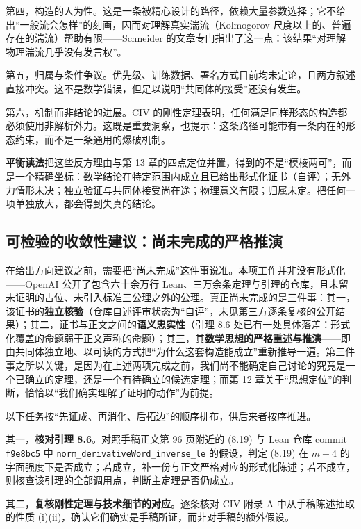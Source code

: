第四，构造的人为性。这是一条被精心设计的路径，依赖大量参数选择；它不给出“一般流会怎样”的刻画，因而对理解真实湍流（Kolmogorov 尺度以上的、普遍存在的湍流）帮助有限——Schneider 的文章专门指出了这一点：该结果“对理解物理湍流几乎没有发言权”。

第五，归属与条件争议。优先级、训练数据、署名方式目前均未定论，且两方叙述直接冲突。这不是数学错误，但足以说明“共同体的接受”还没有发生。

第六，机制而非结论的进展。CIV 的刚性定理表明，任何满足同样形态的构造都必须使用非解析外力。这既是重要洞察，也提示：这条路径可能带有一条内在的形态约束，而不是一条通用的爆破机制。

\begin{keybox}
\textbf{平衡读法}\quad 把这些反方理由与第 13 章的四点定位并置，得到的不是“模棱两可”，而是一个精确坐标：数学结论在特定范围内成立且已给出形式化证书（自评）；无外力情形未决；独立验证与共同体接受尚在途；物理意义有限；归属未定。把任何一项单独放大，都会得到失真的结论。
\end{keybox}

\subsection{可检验的收敛性建议：尚未完成的严格推演}

在给出方向建议之前，需要把“尚未完成”这件事说准。本项工作并非没有形式化——OpenAI 公开了包含六十余万行 Lean、三万余条定理与引理的仓库，且未留未证明的占位、未引入标准三公理之外的公理。真正尚未完成的是三件事：其一，该证书的\textbf{独立核验}（仓库自述评审状态为“自评”，未见第三方逐条复核的公开结果）；其二，证书与正文之间的\textbf{语义忠实性}（引理 8.6 处已有一处具体落差：形式化覆盖的命题弱于正文声称的命题）；其三，其\textbf{数学思想的严格重述与推演}——即由共同体独立地、以可读的方式把“为什么这套构造能成立”重新推导一遍。第三件事之所以关键，是因为在上述两项完成之前，我们尚不能确定自己讨论的究竟是一个已确立的定理，还是一个有待确立的候选定理；而第 12 章关于“思想定位”的判断，恰恰以“我们确实理解了证明的动作”为前提。

以下任务按“先证成、再消化、后拓边”的顺序排布，供后来者按序推进。

其一，\textbf{核对引理 8.6}。对照手稿正文第 96 页附近的 (8.19) 与 Lean 仓库 commit \texttt{f9e8bc5} 中 \texttt{norm\_derivativeWord\_inverse\_le} 的假设，判定 (8.19) 在 $m+4$ 的字面强度下是否成立；若成立，补一份与正文严格对应的形式化陈述；若不成立，则核查该引理的全部调用点，判断主定理是否仍成立。

其二，\textbf{复核刚性定理与技术细节的对应}。逐条核对 CIV 附录 A 中从手稿陈述抽取的性质 (i)(ii)，确认它们确实是手稿所证，而非对手稿的额外假设。

